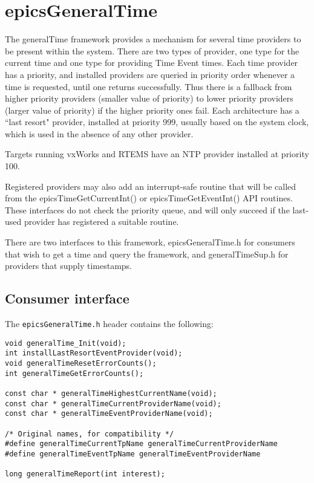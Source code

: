 \section{epicsGeneralTime}

The generalTime framework provides a mechanism for several time providers to be present within the system.  There are 
two types of provider, one type for the current time and one type for providing Time Event times.  Each time provider has 
a priority, and installed providers are queried in priority order whenever a time is requested, until one returns successfully.  
Thus there is a fallback from higher priority providers (smaller value of priority) to lower priority providers (larger value 
of priority) if the higher priority ones fail.  Each architecture has a ``last resort" provider, installed at priority 999, usually 
based on the system clock, which is used in the absence of any other provider.

Targets running vxWorks and RTEMS have an NTP provider installed at priority 100.

Registered providers may also add an interrupt-safe routine that will be called from the epicsTimeGetCurrentInt() or 
epicsTimeGetEventInt()  API routines. These interfaces do not check the priority queue, and will only succeed if the last-
used provider has registered a suitable routine.

There are two interfaces to this framework, epicsGeneralTime.h for consumers that wish to get a time and query the 
framework, and generalTimeSup.h for providers that supply timestamps.

\subsection{Consumer interface}

The \verb|epicsGeneralTime.h| header contains the following:

\begin{verbatim}
void generalTime_Init(void);
int installLastResortEventProvider(void);
void generalTimeResetErrorCounts();
int generalTimeGetErrorCounts();

const char * generalTimeHighestCurrentName(void);
const char * generalTimeCurrentProviderName(void);
const char * generalTimeEventProviderName(void);

/* Original names, for compatibility */
#define generalTimeCurrentTpName generalTimeCurrentProviderName
#define generalTimeEventTpName generalTimeEventProviderName

long generalTimeReport(int interest);
\end{verbatim}

